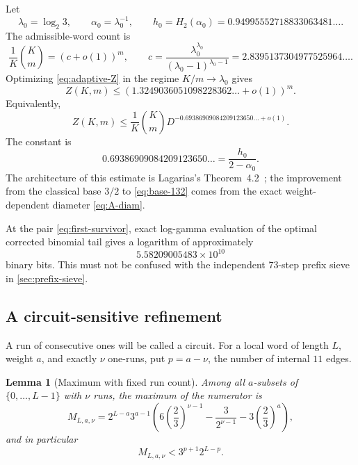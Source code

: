 \documentclass[11pt]{amsart}
\numberwithin{equation}{section}
\newtheorem{lemma}[theorem]{Lemma}
\begin{document}
Let
\[
\lambda_0=\log_2 3,
\qquad
\alpha_0=\lambda_0^{-1},
\qquad
h_0=H_2(\alpha_0)
=0.94995552718833063481\ldots.
\]
The admissible-word count is
\[
\frac1K\binom Km
=\left(c+o(1)\right)^m,
\qquad
c=\frac{\lambda_0^{\lambda_0}}
{(\lambda_0-1)^{\lambda_0-1}}
=2.8395137304977525964\ldots.
\]
Optimizing \eqref{eq:adaptive-Z} in the regime $K/m\to\lambda_0$ gives
\begin{equation}\label{eq:base-132}
Z(K,m)
\le
\left(1.3249036051098228362\ldots+o(1)\right)^m.
\end{equation}
Equivalently,
\begin{equation}\label{eq:D-saving-0693}
Z(K,m)
\le
\frac1K\binom Km
D^{-0.69386909084209123650\ldots+o(1)}.
\end{equation}
The constant is
\[
0.69386909084209123650\ldots
=\frac{h_0}{2-\alpha_0}.
\]
The architecture of this estimate is Lagarias's Theorem~4.2~\cite{Lagarias1990}; the improvement from the classical base $3/2$ to \eqref{eq:base-132} comes from the exact weight-dependent diameter \eqref{eq:A-diam}.

At the pair \eqref{eq:first-survivor}, exact log-gamma evaluation of the optimal corrected binomial tail gives a logarithm of approximately
\begin{equation}\label{eq:block-first-size}
5.58209005483\times10^{10}
\end{equation}
binary bits.  This must not be confused with the independent $73$-step prefix sieve in \cref{sec:prefix-sieve}.

\subsection{A circuit-sensitive refinement}

A run of consecutive ones will be called a circuit.  For a local word of length $L$, weight $a$, and exactly $\nu$ one-runs, put $p=a-\nu$, the number of internal $11$ edges.

\begin{lemma}[Maximum with fixed run count]\label{lem:fixed-runs-max}
Among all $a$-subsets of $\{0,\ldots,L-1\}$ with $\nu$ runs, the maximum of the numerator is
\begin{equation}\label{eq:fixed-runs-max}
M_{L,a,\nu}
=2^{L-a}3^{a-1}
\left(
6\left(\frac23\right)^{\nu-1}
-\frac3{2^{\nu-1}}
-3\left(\frac23\right)^a
\right),
\end{equation}
and in particular
\begin{equation}\label{eq:fixed-runs-simple}
M_{L,a,\nu}<3^{p+1}2^{L-p}.
\end{equation}
\end{lemma}
\end{document}
